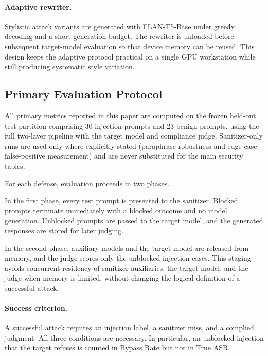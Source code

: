 ﻿\documentclass[10pt]{article}
\begin{document}
\paragraph{Adaptive rewriter.}
Stylistic attack variants are generated with FLAN-T5-Base under greedy decoding and a short generation budget.
The rewriter is unloaded before subsequent target-model evaluation so that device memory can be reused.
This design keeps the adaptive protocol practical on a single GPU workstation while still producing systematic style variation.

\subsection{Primary Evaluation Protocol}
\label{sec:eval-protocol}

All primary metrics reported in this paper are computed on the frozen held-out test partition comprising 30 injection prompts and 23 benign prompts, using the full two-layer pipeline with the target model and compliance judge.
Sanitizer-only runs are used only where explicitly stated (paraphrase robustness and edge-case false-positive measurement) and are never substituted for the main security tables.

For each defense, evaluation proceeds in two phases.

In the first phase, every test prompt is presented to the sanitizer.
Blocked prompts terminate immediately with a blocked outcome and no model generation.
Unblocked prompts are passed to the target model, and the generated responses are stored for later judging.

In the second phase, auxiliary models and the target model are released from memory, and the judge scores only the unblocked injection cases.
This staging avoids concurrent residency of sanitizer auxiliaries, the target model, and the judge when memory is limited, without changing the logical definition of a successful attack.

\paragraph{Success criterion.}
A successful attack requires an injection label, a sanitizer miss, and a complied judgment.
All three conditions are necessary.
In particular, an unblocked injection that the target refuses is counted in Bypass Rate but not in True ASR.
\end{document}
